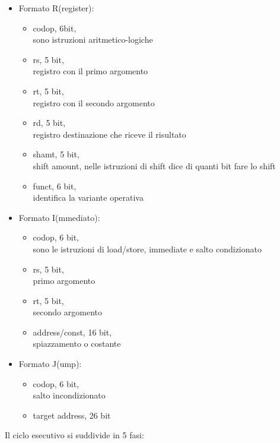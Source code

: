 \documentclass[arch.tex]{subfiles}
\begin{document}
\begin{itemize}
	\item Formato R(register):\\
		\begin{itemize}
			\item codop, 6bit,\\
				sono istruzioni aritmetico-logiche
			\item rs, 5 bit,\\
				registro con il primo argomento
			\item rt, 5 bit,\\
				registro con il secondo argomento
			\item rd, 5 bit,\\
				registro destinazione che riceve il risultato
			\item shamt, 5 bit,\\
				shift amount, nelle istruzioni di shift dice di quanti bit 
				fare lo shift
			\item funct, 6 bit,\\
				identifica la variante operativa
		\end{itemize}
	\item Formato I(mmediato):
		\begin{itemize}
			\item codop, 6 bit,\\
				sono le istruzioni di load/store, immediate e salto condizionato
			\item rs, 5 bit,\\
				primo argomento
			\item rt, 5 bit,\\
				secondo argomento
			\item address/const, 16 bit,\\
				spiazzamento o costante
		\end{itemize}	
	\item Formato J(ump):
		\begin{itemize}
			\item codop, 6 bit,\\
				salto incondizionato
			\item target address, 26 bit
		\end{itemize}
\end{itemize}

%
\label{ppar:Ciclo esecutivo MIPS}
Il ciclo esecutivo si suddivide in 5 fasi:
\end{document}
